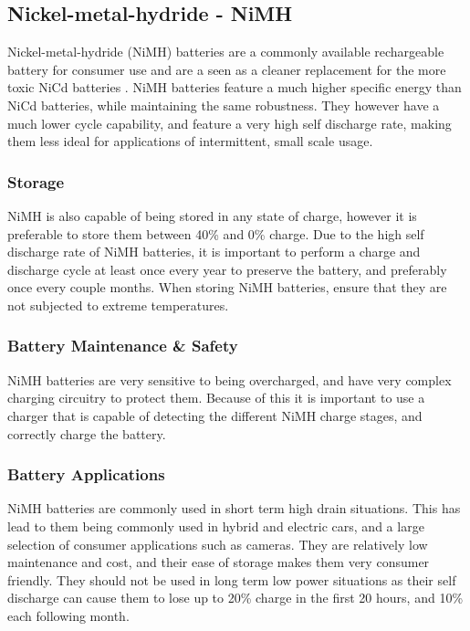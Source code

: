 \documentclass[a4paper,11pt, twocolumn]{article}
\begin{document}
\subsection{Nickel-metal-hydride - NiMH}

Nickel-metal-hydride (NiMH) batteries are a commonly available rechargeable battery for consumer use and are a seen as a cleaner replacement for the more toxic NiCd batteries . NiMH batteries feature a much higher specific energy than NiCd batteries, while maintaining the same robustness. They however have a much lower cycle capability, and feature a very high self discharge rate, making them less ideal for applications of intermittent, small scale usage. 

\subsubsection{Storage}

NiMH is also capable of being stored in any state of charge, however it is preferable to store them between 40\% and 0\% charge. Due to the high self discharge rate of NiMH batteries, it is important to perform a charge and discharge cycle at least once every year to preserve the battery, and preferably once every couple months. When storing NiMH batteries, ensure that they are not subjected to extreme temperatures.  

\subsubsection{Battery Maintenance \& Safety}

NiMH batteries are very sensitive to being overcharged, and have very complex charging circuitry to protect them. Because of this it is important to use a charger that is capable of detecting the different NiMH charge stages, and correctly charge the battery.

\subsubsection{Battery Applications}

NiMH batteries are commonly used in short term high drain situations. This has lead to them being commonly used in hybrid and electric cars, and a large selection of consumer applications such as cameras. They are relatively low maintenance and cost, and their ease of storage makes them very consumer friendly. They should not be used in long term low power situations as their self discharge can cause them to lose up to 20\% charge in the first 20 hours, and 10\% each following month. 
\end{document}
